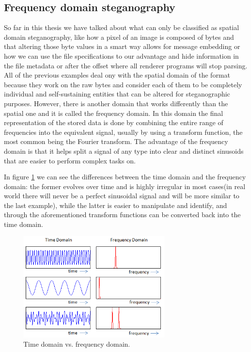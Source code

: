 \begin{multicols*}{2}
\subsection{Frequency domain steganography}
So far in this thesis we have talked about what can only be classified as spatial domain steganography, like how a pixel of an image is composed of bytes and that altering those byte values in a smart way allows for message embedding or how we can use the file specifications to our advantage and hide information in the file metadata or after the offset where all renderer programs will stop parsing. All of the previous examples deal ony with the spatial domain of the format because they work on the raw bytes and consider each of them to be completely individual and self-sustaining entities that can be altered for steganographic purposes. However, there is another domain that works differently than the spatial one and it is called the frequency domain. In this domain the final representation of the stored data is done by combining the entire range of frequencies into the equivalent signal, usually by using a transform function, the most common being the Fourier transform. The advantage of the frequency domain is that it helps split a signal of any type into clear and distinct sinusoids that are easier to perform complex tasks on. 

In figure \ref{time_vs_frequency_comparison} we can see the differences between the time domain and the frequency domain: the former evolves over time and is highly irregular in most cases(in real world there will never be a perfect sinusoidal signal and will be more similar to the last example), while the latter is easier to manipulate and identify, and through the aforementioned transform functions can be converted back into the time domain.
\begin{figure}[H]
    \centering
    \includegraphics[width=7.7cm,keepaspectratio]{pics/audio_chapter/time_vs_frequency_domains.png}
    \caption{Time domain vs. frequency domain.}
    \label{time_vs_frequency_comparison}
\end{figure}


\end{multicols*}
